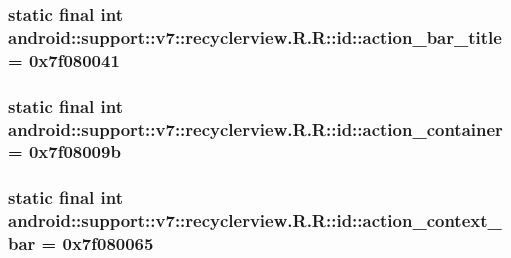 \hypertarget{classandroid_1_1support_1_1v7_1_1recyclerview_1_1_r_1_1id_8ff4917a5d09443f9543cc542fce044d}{
\subsubsection[{action\_\-bar\_\-title}]{\setlength{\rightskip}{0pt plus 5cm}static final int android::support::v7::recyclerview.R.R::id::action\_\-bar\_\-title = 0x7f080041}}
\label{classandroid_1_1support_1_1v7_1_1recyclerview_1_1_r_1_1id_8ff4917a5d09443f9543cc542fce044d}


\hypertarget{classandroid_1_1support_1_1v7_1_1recyclerview_1_1_r_1_1id_2504eaf26f8112d59fd7573503cafd4e}{
\subsubsection[{action\_\-container}]{\setlength{\rightskip}{0pt plus 5cm}static final int android::support::v7::recyclerview.R.R::id::action\_\-container = 0x7f08009b}}
\label{classandroid_1_1support_1_1v7_1_1recyclerview_1_1_r_1_1id_2504eaf26f8112d59fd7573503cafd4e}


\hypertarget{classandroid_1_1support_1_1v7_1_1recyclerview_1_1_r_1_1id_d7010608f40ce16d73eb9af9895c7d41}{
\subsubsection[{action\_\-context\_\-bar}]{\setlength{\rightskip}{0pt plus 5cm}static final int android::support::v7::recyclerview.R.R::id::action\_\-context\_\-bar = 0x7f080065}}
\label{classandroid_1_1support_1_1v7_1_1recyclerview_1_1_r_1_1id_d7010608f40ce16d73eb9af9895c7d41}


